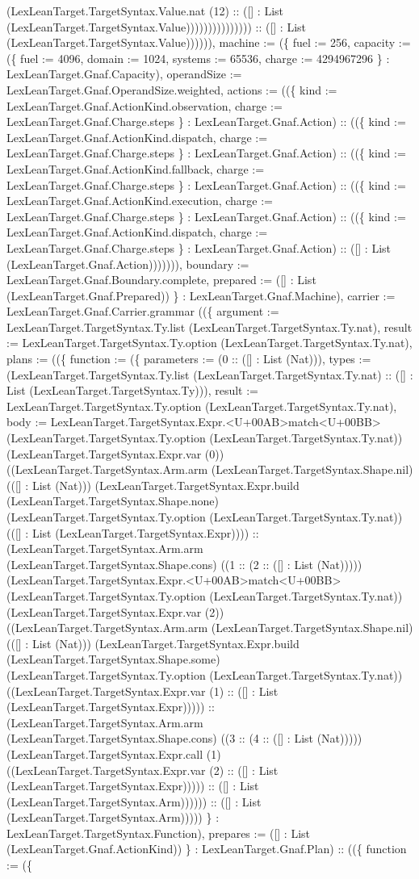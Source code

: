 \documentclass[11pt]{article}
\begin{document}
(LexLeanTarget.TargetSyntax.Value.nat (12) :: ([] : List (LexLeanTarget.TargetSyntax.Value))))))))))))))) :: ([] : List (LexLeanTarget.TargetSyntax.Value)))))), machine := (\{ fuel := 256, capacity := (\{ fuel := 4096, domain := 1024, systems := 65536, charge := 4294967296 \} : LexLeanTarget.Gnaf.Capacity), operandSize := LexLeanTarget.Gnaf.OperandSize.weighted, actions := ((\{ kind := LexLeanTarget.Gnaf.ActionKind.observation, charge := LexLeanTarget.Gnaf.Charge.steps \} : LexLeanTarget.Gnaf.Action) :: ((\{ kind := LexLeanTarget.Gnaf.ActionKind.dispatch, charge := LexLeanTarget.Gnaf.Charge.steps \} : LexLeanTarget.Gnaf.Action) :: ((\{ kind := LexLeanTarget.Gnaf.ActionKind.fallback, charge := LexLeanTarget.Gnaf.Charge.steps \} : LexLeanTarget.Gnaf.Action) :: ((\{ kind := LexLeanTarget.Gnaf.ActionKind.execution, charge := LexLeanTarget.Gnaf.Charge.steps \} : LexLeanTarget.Gnaf.Action) :: ((\{ kind := LexLeanTarget.Gnaf.ActionKind.dispatch, charge := LexLeanTarget.Gnaf.Charge.steps \} : LexLeanTarget.Gnaf.Action) :: ([] : List (LexLeanTarget.Gnaf.Action))))))), boundary := LexLeanTarget.Gnaf.Boundary.complete, prepared := ([] : List (LexLeanTarget.Gnaf.Prepared)) \} : LexLeanTarget.Gnaf.Machine), carrier := LexLeanTarget.Gnaf.Carrier.grammar ((\{ argument := LexLeanTarget.TargetSyntax.Ty.list (LexLeanTarget.TargetSyntax.Ty.nat), result := LexLeanTarget.TargetSyntax.Ty.option (LexLeanTarget.TargetSyntax.Ty.nat), plans := ((\{ function := (\{ parameters := (0 :: ([] : List (Nat))), types := (LexLeanTarget.TargetSyntax.Ty.list (LexLeanTarget.TargetSyntax.Ty.nat) :: ([] : List (LexLeanTarget.TargetSyntax.Ty))), result := LexLeanTarget.TargetSyntax.Ty.option (LexLeanTarget.TargetSyntax.Ty.nat), body := LexLeanTarget.TargetSyntax.Expr.<U+00AB>match<U+00BB> (LexLeanTarget.TargetSyntax.Ty.option (LexLeanTarget.TargetSyntax.Ty.nat)) (LexLeanTarget.TargetSyntax.Expr.var (0)) ((LexLeanTarget.TargetSyntax.Arm.arm (LexLeanTarget.TargetSyntax.Shape.nil) (([] : List (Nat))) (LexLeanTarget.TargetSyntax.Expr.build (LexLeanTarget.TargetSyntax.Shape.none) (LexLeanTarget.TargetSyntax.Ty.option (LexLeanTarget.TargetSyntax.Ty.nat)) (([] : List (LexLeanTarget.TargetSyntax.Expr)))) :: (LexLeanTarget.TargetSyntax.Arm.arm (LexLeanTarget.TargetSyntax.Shape.cons) ((1 :: (2 :: ([] : List (Nat))))) (LexLeanTarget.TargetSyntax.Expr.<U+00AB>match<U+00BB> (LexLeanTarget.TargetSyntax.Ty.option (LexLeanTarget.TargetSyntax.Ty.nat)) (LexLeanTarget.TargetSyntax.Expr.var (2)) ((LexLeanTarget.TargetSyntax.Arm.arm (LexLeanTarget.TargetSyntax.Shape.nil) (([] : List (Nat))) (LexLeanTarget.TargetSyntax.Expr.build (LexLeanTarget.TargetSyntax.Shape.some) (LexLeanTarget.TargetSyntax.Ty.option (LexLeanTarget.TargetSyntax.Ty.nat)) ((LexLeanTarget.TargetSyntax.Expr.var (1) :: ([] : List (LexLeanTarget.TargetSyntax.Expr))))) :: (LexLeanTarget.TargetSyntax.Arm.arm (LexLeanTarget.TargetSyntax.Shape.cons) ((3 :: (4 :: ([] : List (Nat))))) (LexLeanTarget.TargetSyntax.Expr.call (1) ((LexLeanTarget.TargetSyntax.Expr.var (2) :: ([] : List (LexLeanTarget.TargetSyntax.Expr))))) :: ([] : List (LexLeanTarget.TargetSyntax.Arm)))))) :: ([] : List (LexLeanTarget.TargetSyntax.Arm))))) \} : LexLeanTarget.TargetSyntax.Function), prepares := ([] : List (LexLeanTarget.Gnaf.ActionKind)) \} : LexLeanTarget.Gnaf.Plan) :: ((\{ function := (\{ 
\end{document}
